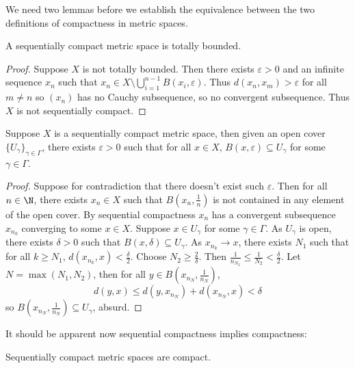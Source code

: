 \documentclass[a4paper]{article}
\begin{document}
We need two lemmas before we establish the equivalence between the two definitions of compactness in metric spaces.

\begin{lemma}
  A sequentially compact metric space is totally bounded.
\end{lemma}

\begin{proof}
  Suppose \(X\) is not totally bounded. Then there exists \(\varepsilon > 0\) and an infinite sequence \(x_n\) such that \(x_n \in X \setminus \bigcup_{i = 1}^{n - 1} B(x_i, \varepsilon)\). Thus \(d(x_n, x_m) > \varepsilon\) for all \(m \neq n\) so \((x_n)\) has no Cauchy subsequence, so no convergent subsequence. Thus \(X\) is not sequentially compact.
\end{proof}

\begin{lemma}
  Suppose \(X\) is a sequentially compact metric space, then given an open cover \(\{U_\gamma\}_{\gamma \in \Gamma}\), there exists \(\varepsilon > 0\) such that for all \(x \in X\), \(B(x, \varepsilon) \subseteq U_\gamma\) for some \(\gamma \in \Gamma\).
\end{lemma}

\begin{proof}
  Suppose for contradiction that there doesn't exist such \(\varepsilon\). Then for all \(n \in \N\), there exists \(x_n \in X\) such that \(B(x_n, \frac{1}{n})\) is not contained in any element of the open cover. By sequential compactness \(x_n\) has a convergent subsequence \(x_{n_k}\) converging to some \(x \in X\). Suppose \(x \in U_\gamma\) for some \(\gamma \in \Gamma\). As \(U_\gamma\) is open, there exists \(\delta > 0\) such that \(B(x, \delta) \subseteq U_\gamma\). As \(x_{n_k} \to x\), there exists \(N_1\) such that for all \(k \geq N_1\), \(d(x_{n_k}, x) < \frac{\delta}{2}\). Choose \(N_2 \geq \frac{2}{\delta}\). Then \(\frac{1}{n_{N_2}} \leq \frac{1}{N_2} < \frac{\delta}{2}\). Let \(N = \max(N_1, N_2)\), then for all \(y \in B(x_{n_N}, \frac{1}{n_N})\),
  \[
    d(y, x) \leq d(y, x_{n_N}) + d(x_{n_N}, x) < \delta
  \]
  so \(B(x_{n_N}, \frac{1}{n_N}) \subseteq U_\gamma\), absurd.
\end{proof}

It should be apparent now sequential compactness implies compactness:

\begin{proposition}
  Sequentially compact metric spaces are compact.
\end{proposition}
\end{document}
